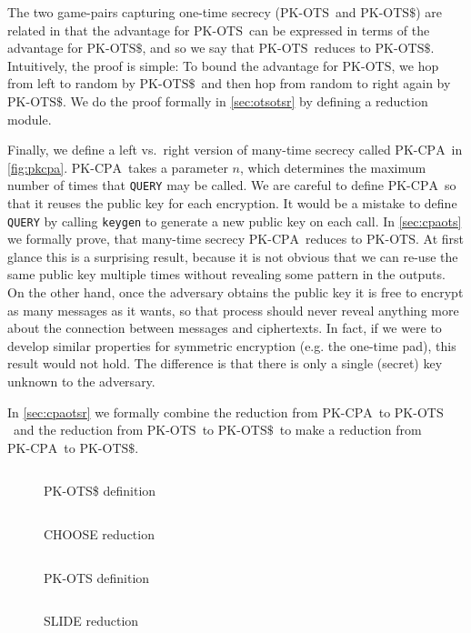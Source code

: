 \documentclass[a4paper,USenglish,cleveref, autoref]{lipics-v2021}
\newcommand{\M}[1]{\texttt{#1}}
\newcommand{\CPA}{\ensuremath{\mathrm{PK\text{-}CPA}}}
\newcommand{\OTS}{\ensuremath{\mathrm{PK\text{-}OTS}}}
\newcommand{\OTSR}{\ensuremath{\mathrm{PK\text{-}OTS\$}}}
\begin{document}
The two game-pairs capturing  one-time secrecy (\OTS\ and \OTSR) are related in that the advantage for \OTS\ can be
expressed in terms of the advantage for \OTSR, and so we say that \OTS\ reduces to \OTSR.
Intuitively, the proof is simple: To bound the advantage for \OTS, we hop from
left to random by \OTSR\ and then hop from random to right again by \OTSR.
We do the proof formally in \cref{sec:otsotsr} by defining a reduction module.

Finally, we define a left vs.\ right version of many-time secrecy called \CPA\ in \cref{fig:pkcpa}.
\CPA\ takes a parameter $n$, which determines the maximum number of times that \M{QUERY} may be called.
We are careful to define \CPA\ so that it reuses the public key for each encryption. It would
be a mistake to define \M{QUERY} by calling \M{keygen} to generate a new public key on each call.
In \cref{sec:cpaots} we formally prove, that many-time secrecy \CPA\ reduces to \OTS.
At first glance this is a surprising result, because it is not obvious that we can re-use
the same public key multiple times without revealing some pattern in the outputs. On the other hand,
once the adversary obtains the public key it is free to encrypt as many messages as it wants,
so that process should never reveal anything more about the connection between messages and ciphertexts.
In fact, if we were to develop similar properties for symmetric
encryption (e.g. the one-time pad), this result would not hold. The difference is that there is only a single (secret) key unknown
to the adversary.

In \cref{sec:cpaotsr} we formally combine the reduction from \CPA\ to \OTS\ and
the reduction from \OTS\ to \OTSR\ to make a reduction from \CPA\ to \OTSR.


\begin{figure}
  \begin{minipage}[t]{0.49\textwidth}
    \inputminted{coq}{snippets/pkotsr.v}
    \caption{PK-OTS\$ definition}
    \label{fig:pkotsr}
    \inputminted{coq}{snippets/choose.v}
    \caption{CHOOSE reduction}
    \label{fig:choose}
  \end{minipage} \hfill \begin{minipage}[t]{0.49\textwidth}
    \inputminted{coq}{snippets/pkots.v}
    \caption{PK-OTS definition}
    \label{fig:pkots}
    \inputminted{coq}{snippets/slide.v}
    \caption{SLIDE reduction}
    \label{fig:slide}
  \end{minipage}
\end{figure}
\end{document}
